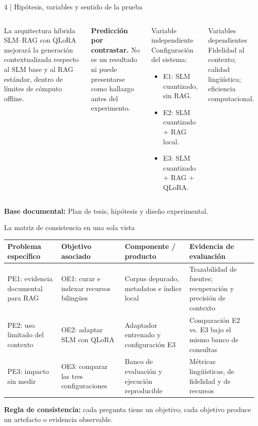 \documentclass[aspectratio=169,10pt,spanish]{beamer}
\newcommand{\fuente}[1]{\vfill{\tiny\color{bpNavy!75}\textbf{Base documental:} #1}}
\begin{document}
\begin{frame}{4 | Hipótesis, variables y sentido de la prueba}
\begin{columns}[T,onlytextwidth]
\begin{tcolorbox}[colback=bpLightGray,colframe=bpGold,title={Hipótesis del plan}]
\small La arquitectura híbrida SLM--RAG con QLoRA mejorará la generación contextualizada respecto al SLM base y al RAG estándar, dentro de límites de cómputo offline.
\end{tcolorbox}
\begin{tcolorbox}[colback=white,colframe=bpRust,title={Estado}]
\small\textbf{Predicción por contrastar.} No es un resultado ni puede presentarse como hallazgo antes del experimento.
\end{tcolorbox}
\begin{block}{Variable independiente}
Configuración del sistema:
\begin{itemize}\small
\item E1: SLM cuantizado, sin RAG.
\item E2: SLM cuantizado + RAG local.
\item E3: SLM cuantizado + RAG + QLoRA.
\end{itemize}
\end{block}
\begin{block}{Variables dependientes}
Fidelidad al contexto; calidad lingüística; eficiencia computacional.
\end{block}
\end{columns}
\fuente{Plan de tesis, hipótesis y diseño experimental.}
\end{frame}

\begin{frame}{La matriz de consistencia en una sola vista}
\scriptsize
\begin{tabularx}{\textwidth}{p{2.15cm} p{3.55cm} p{3.35cm} X}
\toprule
\textbf{Problema específico} & \textbf{Objetivo asociado} & \textbf{Componente / producto} & \textbf{Evidencia de evaluación}\\
\midrule
PE1: evidencia documental para RAG & OE1: curar e indexar recursos bilingües & Corpus depurado, metadatos e índice local & Trazabilidad de fuentes; recuperación y precisión de contexto\\
\midrule
PE2: uso limitado del contexto & OE2: adaptar SLM con QLoRA & Adaptador entrenado y configuración E3 & Comparación E2 vs. E3 bajo el mismo banco de consultas\\
\midrule
PE3: impacto sin medir & OE3: comparar las tres configuraciones & Banco de evaluación y ejecución reproducible & Métricas lingüísticas, de fidelidad y de recursos\\
\bottomrule
\end{tabularx}
\vspace{0.25cm}
\begin{tcolorbox}[colback=bpLightGray,colframe=bpNavy]
\centering\small\textbf{Regla de consistencia:} cada pregunta tiene un objetivo; cada objetivo produce un artefacto o evidencia observable.
\end{tcolorbox}
\end{frame}
\end{document}
